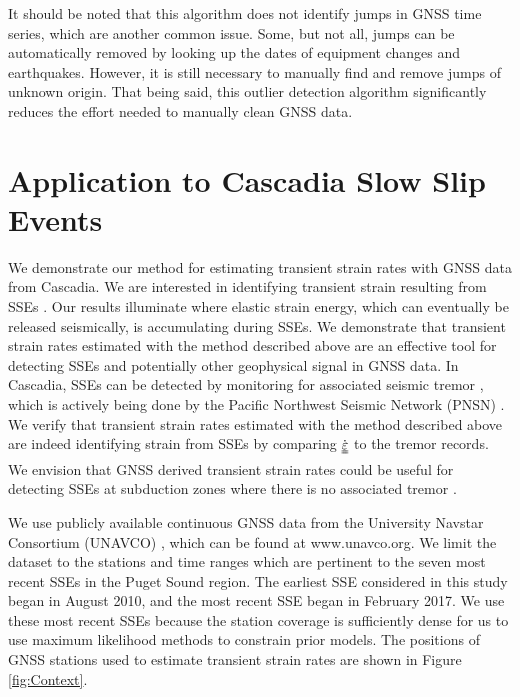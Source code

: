\documentclass[extra,mreferee]{gji}
\newcommand*{\du}[1]{\uuline{#1}}
\begin{document}
It should be noted that this algorithm does not identify jumps in GNSS time series, which are another common issue. Some, but not all, jumps can be automatically removed by looking up the dates of equipment changes and earthquakes. However, it is still necessary to manually find and remove jumps of unknown origin. That being said, this outlier detection algorithm significantly reduces the effort needed to manually clean GNSS data.       

\section{Application to Cascadia Slow Slip Events}\label{sec:Cascadia}
We demonstrate our method for estimating transient strain rates with GNSS data from Cascadia. We are interested in identifying transient strain resulting from SSEs \citep[e.g.,][]{Dragert2001}. Our results illuminate where elastic strain energy, which can eventually be released seismically, is accumulating during SSEs. We demonstrate that transient strain rates estimated with the method described above are an effective tool for detecting SSEs and potentially other geophysical signal in GNSS data.  In Cascadia, SSEs can be detected by monitoring for associated seismic tremor \citep{Rogers2003}, which is actively being done by the Pacific Northwest Seismic Network (PNSN) \citep{Wech2010}. We verify that transient strain rates estimated with the method described above are indeed identifying strain from SSEs by comparing $\dot{\du{\varepsilon}}$ to the tremor records.  We envision that GNSS derived transient strain rates could be useful for detecting SSEs at subduction zones where there is no associated tremor \citep{Schwartz2007}.

We use publicly available continuous GNSS data from the University Navstar Consortium (UNAVCO) \citep{Herring2016}, which can be found at www.unavco.org. We limit the dataset to the stations and time ranges which are pertinent to the seven most recent SSEs in the Puget Sound region. The earliest SSE considered in this study began in August 2010, and the most recent SSE began in February 2017. We use these most recent SSEs because the station coverage is sufficiently dense for us to use maximum likelihood methods to constrain prior models.  The positions of GNSS stations used to estimate transient strain rates are shown in Figure \ref{fig:Context}.  
\end{document}
